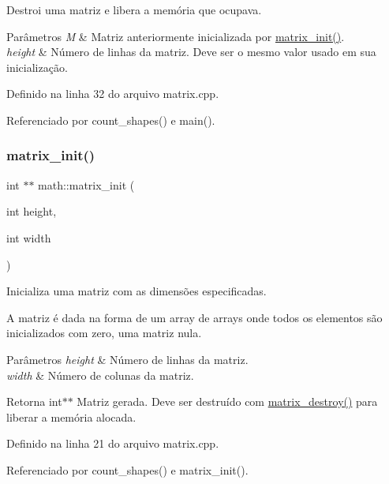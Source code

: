 Destroi uma matriz e libera a memória que ocupava. 


\begin{DoxyParams}{Parâmetros}
{\em M} & Matriz anteriormente inicializada por \mbox{\hyperlink{namespacemath_ac47b11361b7d12063c2c2d3c3f030e6d}{matrix\+\_\+init()}}. \\
\hline
{\em height} & Número de linhas da matriz. Deve ser o mesmo valor usado em sua inicialização. \\
\hline
\end{DoxyParams}


Definido na linha 32 do arquivo matrix.\+cpp.



Referenciado por count\+\_\+shapes() e main().

\mbox{\label{namespacemath_ac47b11361b7d12063c2c2d3c3f030e6d}} 
\subsubsection{\texorpdfstring{matrix\_init()}{matrix\_init()}}
{\footnotesize\ttfamily int $\ast$$\ast$ math\+::matrix\+\_\+init (\begin{DoxyParamCaption}\item[{int}]{height,  }\item[{int}]{width }\end{DoxyParamCaption})}



Inicializa uma matriz com as dimensões especificadas. 

A matriz é dada na forma de um array de arrays onde todos os elementos são inicializados com zero, uma matriz nula.


\begin{DoxyParams}{Parâmetros}
{\em height} & Número de linhas da matriz. \\
\hline
{\em width} & Número de colunas da matriz. \\
\hline
\end{DoxyParams}
\begin{DoxyReturn}{Retorna}
int$\ast$$\ast$ Matriz gerada. Deve ser destruído com \mbox{\hyperlink{namespacemath_ab71def2c0ba5a16ca9b8b0ad9ed7034f}{matrix\+\_\+destroy()}} para liberar a memória alocada. 
\end{DoxyReturn}


Definido na linha 21 do arquivo matrix.\+cpp.



Referenciado por count\+\_\+shapes() e matrix\+\_\+init().

